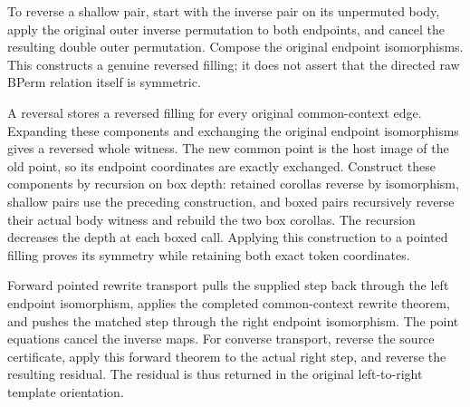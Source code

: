 To reverse a shallow pair, start with the inverse pair on its unpermuted
body, apply the original outer inverse permutation to both endpoints, and
cancel the resulting double outer permutation. Compose the original endpoint
isomorphisms. This constructs a genuine reversed filling; it does not assert
that the directed raw BPerm relation itself is symmetric.


A reversal stores a reversed filling for every original common-context edge.
Expanding these components and exchanging the original endpoint isomorphisms
gives a reversed whole witness. The new common point is the host image of
the old point, so its endpoint coordinates are exactly exchanged. Construct
these components by recursion on box depth: retained corollas reverse by
isomorphism, shallow pairs use the preceding construction, and boxed pairs
recursively reverse their actual body witness and rebuild the two box
corollas. The recursion decreases the depth at each boxed call. Applying
this construction to a pointed filling proves its symmetry while retaining
both exact token coordinates.


Forward pointed rewrite transport pulls the supplied step back through the
left endpoint isomorphism, applies the completed common-context rewrite
theorem, and pushes the matched step through the right endpoint isomorphism.
The point equations cancel the inverse maps. For converse transport, reverse
the source certificate, apply this forward theorem to the actual right step,
and reverse the resulting residual. The residual is thus returned in the
original left-to-right template orientation.


